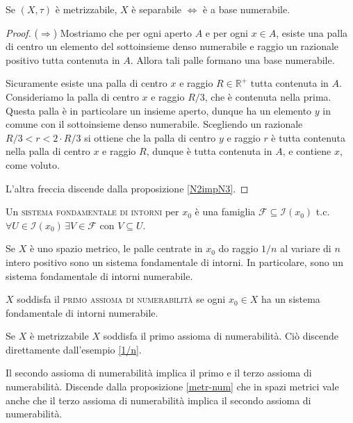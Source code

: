 \documentclass{article}
\begin{document}
\begin{prop} \label{metr-num}
	Se $(X, \tau)$ è metrizzabile, $X$ è separabile $\Leftrightarrow$ è a base
	numerabile.
\end{prop}

\begin{proof}
	($\Rightarrow$) Mostriamo che per ogni aperto $A$ e per ogni $x \in A$,
	esiste una palla di centro un elemento del sottoinsieme denso numerabile e
	raggio un razionale positivo tutta contenuta in $A$. Allora tali palle
	formano una base numerabile.

	Sicuramente esiste una palla di centro $x$ e raggio $R \in \mathbb{R}^+$
	tutta contenuta in $A$. Consideriamo la palla di centro $x$ e raggio $R/3$,
	che è contenuta nella prima. Questa palla è in particolare un insieme
	aperto, dunque ha un elemento $y$ in comune con il sottoinsieme denso
	numerabile. Scegliendo un razionale $R/3<r<2 \cdot R/3$ si ottiene che la
	palla di centro $y$ e raggio $r$ è tutta contenuta nella palla di centro $x$
	e raggio $R$, dunque è tutta contenuta in $A$, e contiene $x$, come voluto.

	L'altra freccia discende dalla proposizione \ref{N2impN3}.
\end{proof}

\begin{defn}
	Un \textsc{sistema fondamentale di intorni} per $x_0$ è una famiglia
	$\mathcal{F} \subseteq \mathcal{I}(x_0)$ t.c. $\forall U \in
	\mathcal{I}(x_0) \, \exists V \in \mathcal{F}$ con $V \subseteq U$.
\end{defn}

\begin{ex} \label{1/n}
	Se $X$ è uno spazio metrico, le palle centrate in $x_0$ do raggio $1/n$ al
	variare di $n$ intero positivo sono un sistema fondamentale di intorni. In
	particolare, sono un sistema fondamentale di intorni numerabile.
\end{ex}

\begin{defn} \label{N1}
	$X$ soddisfa il \textsc{primo assioma di numerabilità} se ogni $x_0 \in X$
	ha un sistema fondamentale di intorni numerabile.
\end{defn}

\begin{ftt}
	Se $X$ è metrizzabile $X$ soddisfa il primo assioma di numerabilità. Ciò
	discende direttamente dall'esempio \ref{1/n}.
\end{ftt}

\begin{prop} \label{N2power}
	Il secondo assioma di numerabilità implica il primo e il terzo assioma di
	numerabilità. Discende dalla proposizione \ref{metr-num} che in spazi
	metrici vale anche che il terzo assioma di numerabilità implica il secondo
	assioma di numerabilità.
\end{prop}
\end{document}
